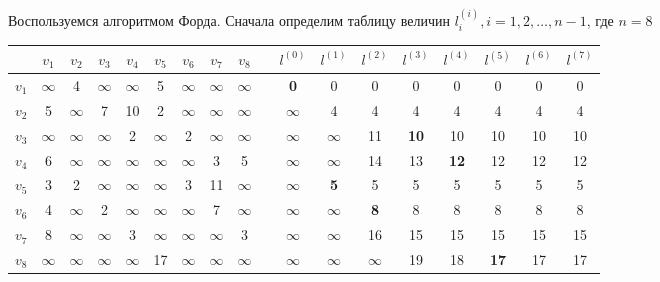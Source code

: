 \documentclass[12pt, letterpaper, titlepage]{article}
\begin{document}
Воспользуемся алгоритмом Форда. Сначала определим таблицу величин $l_{i}^{(i)}, i=1,2,\dots,n-1$, где $n=8$
\begin{center}
    \begin{tabular}{ | c | c | c | c | c | c | c | c | c | c |c |c |c |c |c |c |c |c |}
        \hline
        \rule{0pt}{13pt} & $v_1$      & $v_2$      & $v_3$      & $v_4$       & $v_5$       & $v_6$       & $v_7$     & $v_8$     &
                         & $l^{(0)}$  & $l^{(1)}$  & $l^{(2)}$  & $l^{(3)}$   & $l^{(4)}$   & $l^{(5)}$   & $l^{(6)}$ & $l^{(7)}$   \\
        \hline
        $v_1$            & $\infty$   & 4          & $\infty$   & $\infty$    & 5           & $\infty$    & $\infty$  & $\infty$  &
                         & \textbf{0} & 0          & 0          & 0           & 0           & 0           & 0         & 0           \\
        \hline
        $v_2$            & 5          & $\infty$   & 7          & 10          & 2           & $\infty$    & $\infty$  & $\infty$  &
                         & $\infty$   & 4          & 4          & 4           & 4           & 4           & 4         & 4           \\
        \hline
        $v_3$            & $\infty$   & $\infty$   & $\infty$   & 2           & $\infty$    & 2           & $\infty$  & $\infty$  &
                         & $\infty$   & $\infty$   & 11         & \textbf{10} & 10          & 10          & 10        & 10          \\
        \hline
        $v_4$            & 6          & $\infty$   & $\infty$   & $\infty$    & $\infty$    & $\infty$    & 3         & 5         &
                         & $\infty$   & $\infty$   & 14         & 13          & \textbf{12} & 12          & 12        & 12          \\
        \hline
        $v_5$            & 3          & 2          & $\infty$   & $\infty$    & $\infty$    & 3           & 11        & $\infty$  &
                         & $\infty$   & \textbf{5} & 5          & 5           & 5           & 5           & 5         & 5           \\
        \hline
        $v_6$            & 4          & $\infty$   & 2          & $\infty$    & $\infty$    & $\infty$    & 7         & $\infty$  &
                         & $\infty$   & $\infty$   & \textbf{8} & 8           & 8           & 8           & 8         & 8           \\
        \hline
        $v_7$            & 8          & $\infty$   & $\infty$   & 3           & $\infty$    & $\infty$    & $\infty$  & 3         &
                         & $\infty$   & $\infty$   & 16         & 15          & 15          & 15          & 15        & 15          \\
        \hline
        $v_8$            & $\infty$   & $\infty$   & $\infty$   & $\infty$    & 17          & $\infty$    & $\infty$  & $\infty$  &
                         & $\infty$   & $\infty$   & $\infty$   & 19          & 18          & \textbf{17} & 17        & 17          \\
        \hline
    \end{tabular}
\end{center}
\end{document}
